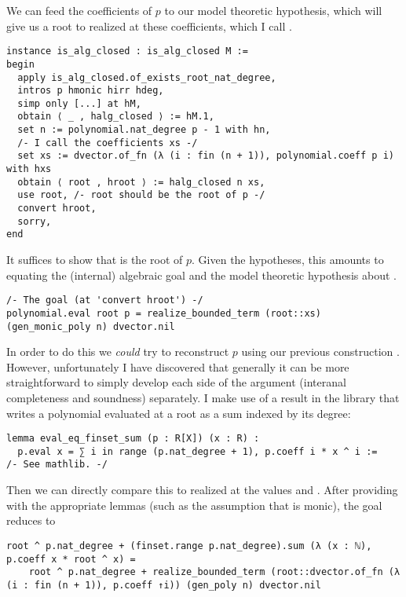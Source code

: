 We can feed the coefficients of $p$ to our model theoretic hypothesis,
which will give us a root to 
realized at these coefficients, which I call .

\begin{lstlisting}
instance is_alg_closed : is_alg_closed M :=
begin
  apply is_alg_closed.of_exists_root_nat_degree,
  intros p hmonic hirr hdeg,
  simp only [...] at hM,
  obtain ⟨ _ , halg_closed ⟩ := hM.1,
  set n := polynomial.nat_degree p - 1 with hn,
  /- I call the coefficients xs -/
  set xs := dvector.of_fn (λ (i : fin (n + 1)), polynomial.coeff p i) with hxs
  obtain ⟨ root , hroot ⟩ := halg_closed n xs,
  use root, /- root should be the root of p -/
  convert hroot,
  sorry,
end
\end{lstlisting}

It suffices to show that  is the root of $p$.
Given the hypotheses, this amounts to equating the (internal) algebraic goal
and the model theoretic hypothesis  about .

\begin{lstlisting}
/- The goal (at 'convert hroot') -/
polynomial.eval root p = realize_bounded_term (root::xs) (gen_monic_poly n) dvector.nil\end{lstlisting}

In order to do this we \textit{could} try to reconstruct $p$
using our previous construction .
However, unfortunately I have discovered that generally it can be
more straightforward to simply develop each side of the argument
(interanal completeness and soundness) separately.
I make use of a result in the library that writes a polynomial
evaluated at a root as a sum indexed by its degree:

\begin{lstlisting}
lemma eval_eq_finset_sum (p : R[X]) (x : R) :
  p.eval x = ∑ i in range (p.nat_degree + 1), p.coeff i * x ^ i :=
/- See mathlib. -/
\end{lstlisting}

Then we can directly compare this to  realized
at the values  and .
After providing  with the appropriate lemmas
(such as the assumption that  is monic),
the goal reduces to

\begin{lstlisting}
root ^ p.nat_degree + (finset.range p.nat_degree).sum (λ (x : ℕ), p.coeff x * root ^ x) =
    root ^ p.nat_degree + realize_bounded_term (root::dvector.of_fn (λ (i : fin (n + 1)), p.coeff ↑i)) (gen_poly n) dvector.nil\end{lstlisting}

